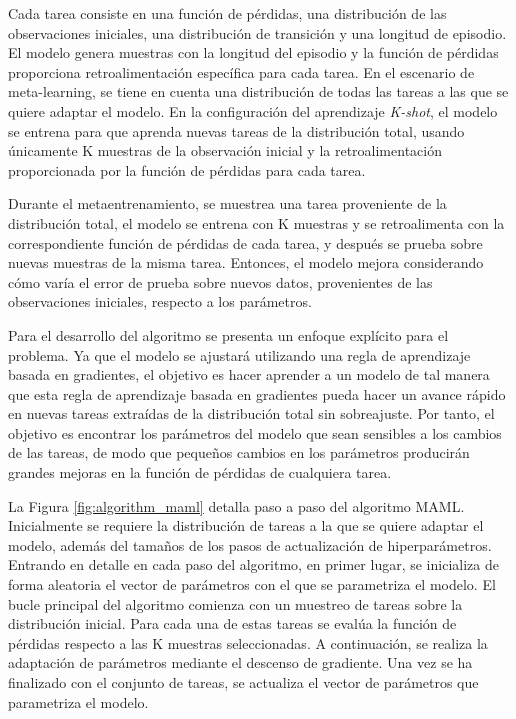 Cada tarea consiste en una función de pérdidas, una distribución de las observaciones iniciales, una distribución de transición y una longitud de episodio. El modelo genera muestras con la longitud del episodio y la función de pérdidas proporciona retroalimentación específica para cada tarea.
En el escenario de meta-learning, se tiene en cuenta una distribución de todas las tareas a las que se quiere adaptar el modelo. En la configuración del aprendizaje \emph{K-shot}, el modelo se entrena para que aprenda nuevas tareas de la distribución total, usando únicamente K muestras de la observación inicial y la retroalimentación proporcionada por la función de pérdidas para cada tarea. 

Durante el metaentrenamiento, se muestrea una tarea proveniente de la distribución total, el modelo se entrena con K muestras y se retroalimenta con la correspondiente función de pérdidas de cada tarea, y después se prueba sobre nuevas muestras de la misma tarea. Entonces, el modelo mejora considerando cómo varía el error de prueba sobre nuevos datos, provenientes de las observaciones iniciales, respecto a los parámetros.

Para el desarrollo del algoritmo se presenta un enfoque explícito para el problema. Ya que el modelo se ajustará utilizando una regla de aprendizaje basada en gradientes, el objetivo es hacer aprender a un modelo de tal manera que esta regla de aprendizaje basada en gradientes pueda hacer un avance rápido en nuevas tareas extraídas de la distribución total sin sobreajuste. Por tanto, el objetivo es encontrar los parámetros del modelo que sean sensibles a los cambios de las tareas, de modo que pequeños cambios en los parámetros producirán grandes mejoras en la función de pérdidas de cualquiera tarea. 

La Figura \ref{fig:algorithm_maml} detalla paso a paso del algoritmo MAML. Inicialmente se requiere la distribución de tareas a la que se quiere adaptar el modelo, además del tamaños de los pasos de actualización de hiperparámetros.
Entrando en detalle en cada paso del algoritmo, en primer lugar, se inicializa de forma aleatoria el vector de parámetros con el que se parametriza el modelo. El bucle principal del algoritmo comienza con un muestreo de tareas sobre la distribución inicial. Para cada una de estas tareas se evalúa la función de pérdidas respecto a las K muestras seleccionadas. A continuación, se realiza la adaptación de parámetros mediante el descenso de gradiente. Una vez se ha finalizado con el conjunto de tareas, se actualiza el vector de parámetros que parametriza el modelo.

